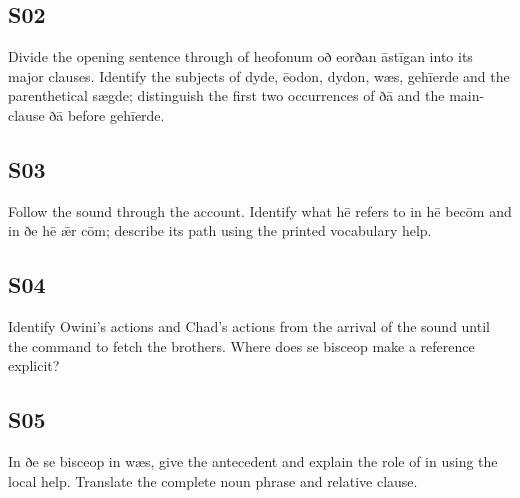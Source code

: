 \par\begin{minipage}{\linewidth}\raggedright
\subsection*{S02}

Divide the opening sentence through of heofonum oð eorðan āstīgan into its major clauses. Identify the subjects of dyde, ēodon, dydon, wæs, gehīerde and the parenthetical sægde; distinguish the first two occurrences of ðā and the main-clause ðā before gehīerde.

\end{minipage}\par\addvspace{4pt}

\par\begin{minipage}{\linewidth}\raggedright
\subsection*{S03}

Follow the sound through the account. Identify what hē refers to in hē becōm and in ðe hē ǣr cōm; describe its path using the printed vocabulary help.

\end{minipage}\par\addvspace{4pt}

\par\begin{minipage}{\linewidth}\raggedright
\subsection*{S04}

Identify Owini’s actions and Chad’s actions from the arrival of the sound until the command to fetch the brothers. Where does se bisceop make a reference explicit?

\end{minipage}\par\addvspace{4pt}

\par\begin{minipage}{\linewidth}\raggedright
\subsection*{S05}

In ðe se bisceop in wæs, give the antecedent and explain the role of in using the local help. Translate the complete noun phrase and relative clause.

\end{minipage}\par\addvspace{4pt}

